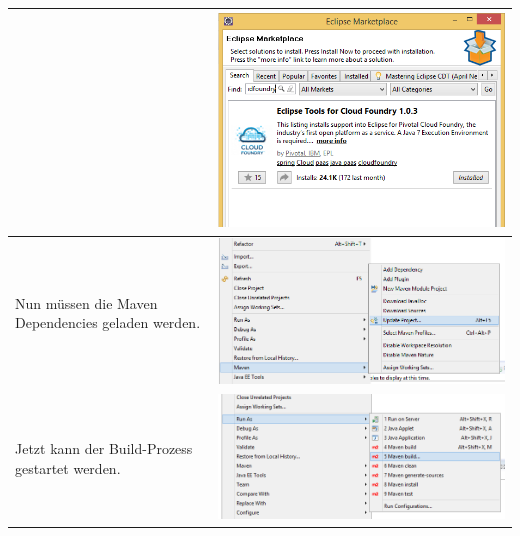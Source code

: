 \begin{longtable}{| p{5cm} | p{11cm} |}
&\includegraphics[width=0.65\columnwidth, valign=T]{images/ddd_basic/3.png}
 \\ \hline 
Nun müssen die Maven Dependencies geladen werden.
&\includegraphics[width=0.65\columnwidth, valign=T]{images/ddd_basic/4.png}
 \\ \hline
Jetzt kann der Build-Prozess gestartet werden.
&\includegraphics[width=0.65\columnwidth, valign=T]{images/ddd_basic/5.png}
\\ \hline 
\end{longtable}
\newpage
